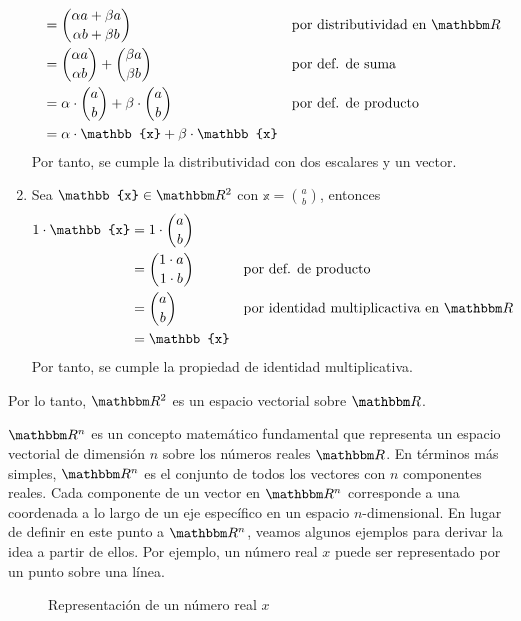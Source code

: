 \begin{example}
\begin{enumerate}[label=\roman*)]
\begin{align*}
            & = \binom{\alpha a+\beta a}{\alpha b+\beta b} && \text{por distributividad en $\RR$} \\
            & = \binom{\alpha a}{\alpha b} + \binom{\beta a}{\beta b} && \text{por def. de suma} \\
            & = \alpha \cdot \binom{a}{b} + \beta \cdot \binom{a}{b} && \text{por def. de producto} \\
            & = \alpha \cdot \mathbb{x} + \beta \cdot \mathbb{x}
        \end{align*}
        Por tanto, se cumple la distributividad con dos escalares y un vector.
        \item Sea $\mathbb{x} \in \RR[2]$ con $\displaystyle \mathbb{x} = \binom{a}{b}$, entonces
        \begin{align*}
            1 \cdot \mathbb{x} & = 1 \cdot \binom{a}{b} \\
            & = \binom{1 \cdot a}{1 \cdot b} && \text{por def. de producto} \\
            & = \binom{a}{b} && \text{por identidad multiplicactiva en $\RR$} \\
            & = \mathbb{x}
        \end{align*}
        Por tanto, se cumple la propiedad de identidad multiplicativa.
    \end{enumerate}
    Por lo tanto, $\RR[2]$ es un espacio vectorial sobre $\RR$.
\end{example}

$\RR[n]$ es un concepto matemático fundamental que representa un espacio vectorial de dimensión $n$ sobre los números reales $\RR$. En términos más simples, $\RR[n]$ es el conjunto de todos los vectores con $n$ componentes reales. Cada componente de un vector en $\RR[n]$ corresponde a una coordenada a lo largo de un eje específico en un espacio $n$-dimensional. En lugar de definir en este punto a $\RR[n]$, veamos algunos ejemplos para derivar la idea a partir de ellos. Por ejemplo, un número real $x$ puede ser representado por un punto sobre una línea.
\begin{figure}[h!]
    \centering
\caption{Representación de un número real $x$}
\end{figure}

